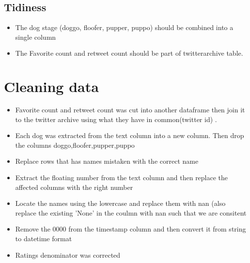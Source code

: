 \documentclass[10pt,a4paper]{article}
\begin{document}
\subsection*{ Tidiness}
\begin{itemize}
\item The dog stage (doggo, floofer, pupper, puppo) should be combined into a single column 
\item The Favorite count and retweet count should be part of twitterarchive table.
\end{itemize}


\section*{Cleaning data}
\begin{itemize}
\item Favorite count and retweet count was cut  into another dataframe then join it to the twitter archive using what they have in common(twitter id) .
\item Each dog was extracted  from the text column into a new column. Then drop the columns doggo,floofer,pupper,puppo
\item Replace rows that has names mistaken with the correct name 
\item Extract the floating number from the text column and then replace the affected columns with the right number
\item Locate the names using the lowercase and replace them with nan (also replace the existing 'None' in the coulmn with nan such that we are consitent
\item Remove the 0000 from the timestamp column and then convert it from string to datetime format
\item Ratings denominator was corrected 
\end{itemize}
\end{document}
